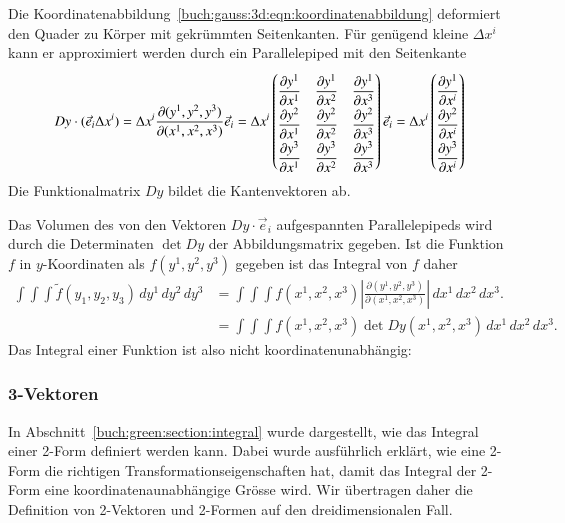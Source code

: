 Die Koordinatenabbildung~\eqref{buch:gauss:3d:eqn:koordinatenabbildung}
deformiert den Quader zu Körper mit gekrümmten Seitenkanten.
Für genügend kleine $\Delta x^i$ kann er approximiert werden durch
ein Parallelepiped mit den Seitenkante
\[
Dy\cdot(\vec{e}_i\Delta x^i)
=
\Delta x^i
\frac{\partial(y^1,y^2,y^3)}{\partial(x^1,x^2,x^3)}
\vec{e}_i
=
\Delta x^i
\renewcommand{\arraystretch}{2.0}
\begin{pmatrix}
\displaystyle\frac{\partial y^1}{\partial x^1}&
\displaystyle\frac{\partial y^1}{\partial x^2}&
\displaystyle\frac{\partial y^1}{\partial x^3}\\
\displaystyle\frac{\partial y^2}{\partial x^1}&
\displaystyle\frac{\partial y^2}{\partial x^2}&
\displaystyle\frac{\partial y^2}{\partial x^3}\\
\displaystyle\frac{\partial y^3}{\partial x^1}&
\displaystyle\frac{\partial y^3}{\partial x^2}&
\displaystyle\frac{\partial y^3}{\partial x^3}
\end{pmatrix}
\vec{e}_i
=
\Delta x^i
\begin{pmatrix}
\displaystyle\frac{\partial y^1}{\partial x^i}\\
\displaystyle\frac{\partial y^2}{\partial x^i}\\
\displaystyle\frac{\partial y^3}{\partial x^i}\\
\end{pmatrix}
\]
Die Funktionalmatrix $Dy$ bildet die Kantenvektoren ab.

Das Volumen des von den Vektoren $Dy\cdot\vec{e}_i$ aufgespannten
Parallelepipeds wird durch die Determinaten $\det Dy$ der
Abbildungsmatrix gegeben. 
Ist die Funktion $f$ in $y$-Koor\-di\-na\-ten als $f(y^1,y^2,y^3)$ gegeben 
ist das Integral von $f$ daher 
\begin{align*}
\int\!\!\!\int\!\!\!\int
\tilde{f}(y_1,y_2,y_3)
\,dy^1
\,dy^2
\,dy^3
&=
\int\!\!\!\int\!\!\!\int
f(x^1,x^2,x^3)
\left|
\frac{\partial (y^1,y^2,y^3)}{\partial(x^1,x^2,x^3)}
\right|
\,dx^1
\,dx^2
\,dx^3.
\\
&=
\int\!\!\!\int\!\!\!\int
f(x^1,x^2,x^3)
\det Dy(x^1,x^2,x^3)
\,dx^1
\,dx^2
\,dx^3.
\end{align*}
Das Integral einer Funktion ist also nicht koordinatenunabhängig:

%
%
\subsubsection{3-Vektoren}
In Abschnitt~\ref{buch:green:section:integral} wurde dargestellt, wie
das Integral einer 2-Form definiert werden kann.
Dabei wurde ausführlich erklärt, wie eine 2-Form die richtigen
Transformationseigenschaften hat, damit das Integral der 2-Form
eine koordinatenaunabhängige Grösse wird.
Wir übertragen daher die Definition von 2-Vektoren und 2-Formen
auf den dreidimensionalen Fall.

